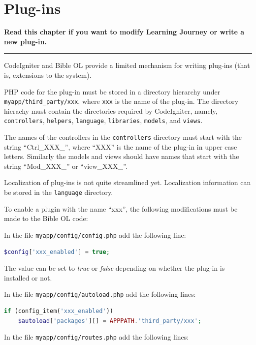 \documentclass[11pt,oneside,a4paper]{memoir}
\begin{document}
\chapter{Plug-ins}

\textbf{Read this chapter if you want to modify Learning Journey or write a new plug-in.}
\plainbreak{3}

CodeIgniter and Bible OL provide a limited mechanism for writing plug-ins (that is, extensions to
the system).

PHP code for the plug-in must be stored in a directory hierarchy under
\texttt{myapp/third\_party/xxx}, where \texttt{xxx} is the name of the plug-in. The directory
hierachy must contain the directories required by CodeIgniter, namely, \texttt{controllers},
\texttt{helpers}, \texttt{language}, \texttt{libraries}, \texttt{models}, and \texttt{views}.

The names of the controllers in the \texttt{controllers} directory must start with the string
``Ctrl\_XXX\_'', where ``XXX'' is the name of the plug-in in upper case letters. Similarly the
models and views should have names that start with the string ``Mod\_XXX\_'' or ``view\_XXX\_''.

Localization of plug-ins is not quite streamlined yet. Localization information can be stored in the
\texttt{language} directory.

To enable a plugin with the name ``xxx'', the following modifications must be made to the Bible OL
code:

In the file \texttt{myapp/config/config.php} add the following line:

\begin{lstlisting}[language=PHP]
$config['xxx_enabled'] = true;
\end{lstlisting}

The value can be set to \emph{true} or \emph{false} depending on whether the plug-in is installed or
not.

In the file \texttt{myapp/config/autoload.php} add the following lines:

\begin{lstlisting}[language=PHP]
if (config_item('xxx_enabled'))
    $autoload['packages'][] = APPPATH.'third_party/xxx';
\end{lstlisting}

In the file \texttt{myapp/config/routes.php} add the following lines:
\end{document}
